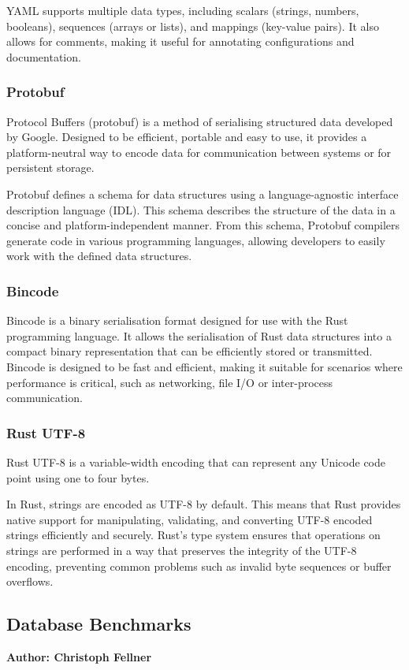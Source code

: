 YAML supports multiple data types, including scalars (strings, numbers, booleans), sequences (arrays or lists), and mappings (key-value pairs). It also allows for comments, making it useful for annotating configurations and documentation.

\subsubsection{Protobuf}
Protocol Buffers (protobuf) is a method of serialising structured data developed by Google. Designed to be efficient, portable and easy to use, it provides a platform-neutral way to encode data for communication between systems or for persistent storage.

Protobuf defines a schema for data structures using a language-agnostic interface description language (IDL). This schema describes the structure of the data in a concise and platform-independent manner. From this schema, Protobuf compilers generate code in various programming languages, allowing developers to easily work with the defined data structures.

\subsubsection{Bincode}
Bincode is a binary serialisation format designed for use with the Rust programming language. It allows the serialisation of Rust data structures into a compact binary representation that can be efficiently stored or transmitted. Bincode is designed to be fast and efficient, making it suitable for scenarios where performance is critical, such as networking, file I/O or inter-process communication.

\subsubsection{Rust UTF-8}
Rust UTF-8 is a variable-width encoding that can represent any Unicode code point using one to four bytes.

In Rust, strings are encoded as UTF-8 by default. This means that Rust provides native support for manipulating, validating, and converting UTF-8 encoded strings efficiently and securely. Rust's type system ensures that operations on strings are performed in a way that preserves the integrity of the UTF-8 encoding, preventing common problems such as invalid byte sequences or buffer overflows.


\subsection{Database Benchmarks}
\textbf{Author: Christoph Fellner}

